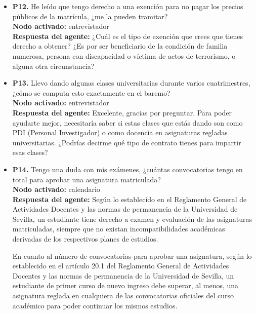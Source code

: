 \documentclass{article}
\begin{document}
\begin{itemize}
            \textbf{Recomendación:} Es importante que el candidato introduzca correctamente los datos de citas de sus artículos científicos y que acredite documentalmente su validez. La comisión evaluará el número de citas válidas para determinar la puntuación correspondiente.

      \item \textbf{P12.} He leído que tengo derecho a una exención para no pagar los precios públicos de la matrícula, ¿me la pueden tramitar? \\
            \textbf{Nodo activado:} entrevistador \\
            \textbf{Respuesta del agente:} ¿Cuál es el tipo de exención que crees que tienes derecho a obtener? ¿Es por ser beneficiario de la condición de familia numerosa, persona con discapacidad o víctima de actos de terrorismo, o alguna otra circunstancia?

      \item \textbf{P13.} Llevo dando algunas clases universitarias durante varios cuatrimestres, ¿cómo se computa esto exactamente en el baremo? \\
            \textbf{Nodo activado:} entrevistador \\
            \textbf{Respuesta del agente:} Excelente, gracias por preguntar. Para poder ayudarte mejor, necesitaría saber si estas clases que estás dando son como PDI (Personal Investigador) o como docencia en asignaturas regladas universitarias. ¿Podrías decirme qué tipo de contrato tienes para impartir esas clases?

      \item \textbf{P14.} Tengo una duda con mis exámenes, ¿cuántas convocatorias tengo en total para aprobar una asignatura matriculada? \\
            \textbf{Nodo activado:} calendario \\
            \textbf{Respuesta del agente:} Según lo establecido en el Reglamento General de Actividades Docentes y las normas de permanencia de la Universidad de Sevilla, un estudiante tiene derecho a examen y evaluación de las asignaturas matriculadas, siempre que no existan incompatibilidades académicas derivadas de los respectivos planes de estudios.

            En cuanto al número de convocatorias para aprobar una asignatura, según lo establecido en el artículo 20.1 del Reglamento General de Actividades Docentes y las normas de permanencia de la Universidad de Sevilla, un estudiante de primer curso de nuevo ingreso debe superar, al menos, una asignatura reglada en cualquiera de las convocatorias oficiales del curso académico para poder continuar los mismos estudios.


\end{itemize}
\end{document}
